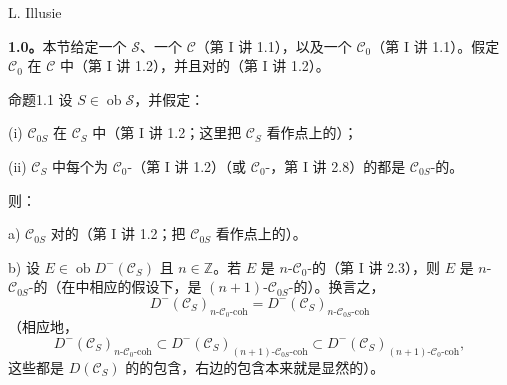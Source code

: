 \begin{center}L. Illusie\end{center}
\textbf{1.0。}本节给定一个 $\mathcal S$、一个 $\mathcal C$（第 I 讲 1.1），以及一个 $\mathcal C_0$（第 I 讲 1.1）。假定 $\mathcal C_0$ 在 $\mathcal C$ 中（第 I 讲 1.2），并且对的（第 I 讲 1.2）。
\begin{SGAresult}{命题}{1.1}
设 $S\in\operatorname{ob}\mathcal S$，并假定：

(i) $\mathcal C_{0S}$ 在 $\mathcal C_S$ 中（第 I 讲 1.2；这里把 $\mathcal C_S$ 看作点上的）；

(ii) $\mathcal C_S$ 中每个为 $\mathcal C_0$-（第 I 讲 1.2）（或 $\mathcal C_0$-，第 I 讲 2.8）的都是 $\mathcal C_{0S}$-的。

则：

a) $\mathcal C_{0S}$ 对的（第 I 讲 1.2；把 $\mathcal C_{0S}$ 看作点上的）。

b) 设 $E\in\operatorname{ob}D^-(\mathcal C_S)$ 且 $n\in\mathbb Z$。若 $E$ 是 $n$-$\mathcal C_0$-的（第 I 讲 2.3），则 $E$ 是 $n$-$\mathcal C_{0S}$-的（在中相应的假设下，是 $(n+1)$-$\mathcal C_{0S}$-的）。换言之，
\[
D^-(\mathcal C_S)_{n\text{-}\mathcal C_0\text{-coh}}=D^-(\mathcal C_S)_{n\text{-}\mathcal C_{0S}\text{-coh}}
\]
（相应地，
\[
D^-(\mathcal C_S)_{n\text{-}\mathcal C_0\text{-coh}}
\subset D^-(\mathcal C_S)_{(n+1)\text{-}\mathcal C_{0S}\text{-coh}}
\subset D^-(\mathcal C_S)_{(n+1)\text{-}\mathcal C_0\text{-coh}},
\]
这些都是 $D(\mathcal C_S)$ 的的包含，右边的包含本来就是显然的）。


\end{SGAresult}

